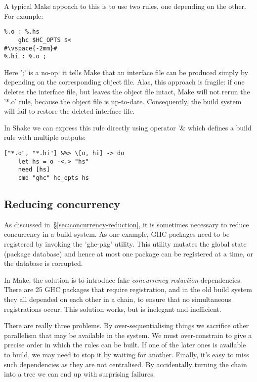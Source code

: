 A typical Make appoach to this is to use two rules, one depending on the other.
For example:

\begin{lstlisting}
%.o : %.hs
    ghc $HC_OPTS $<
#\vspace{-2mm}#
%.hi : %.o ;
\end{lstlisting}
\noindent Here \lst';' is a no-op: it tells Make that an interface file can be
produced simply by depending on the corresponding object file. Alas, this
approach is fragile: if one deletes the interface file, but leaves the object
file intact, Make will not rerun the \lst'*.o' rule, because the object file is
up-to-date. Consequently, the build system will fail to restore the deleted
interface file.

In Shake we can express this rule directly using operator \lst'&%
which defines a build rule with multiple outputs:


\begin{lstlisting}
["*.o", "*.hi"] &%> \[o, hi] -> do
    let hs = o -<.> "hs"
    need [hs]
    cmd "ghc" hc_opts hs
\end{lstlisting}

\subsection{Reducing concurrency\label{sec:ghc-pkg-db}}

As discussed in~\S\ref{sec:concurrency-reduction}, it is sometimes necessary to
reduce concurrency in a build system. As one example, GHC packages need to
be registered by invoking the \lst'ghc-pkg' utility. This utility mutates the
global state (package database) and hence at most one package can be registered
at a time, or the database is corrupted. 

In Make, the solution is to introduce fake \emph{concurrency
reduction} dependencies. There are 25 GHC packages that require registration,
and in the old build system they all depended on each other in a chain, to
ensure that no simultaneous registrations occur. This solution works, but is
inelegant and inefficient.

There are really three problems. By over-sequentialising things we sacrifice
other parallelism that may be available in the system. We must over-constrain to
give a precise order in which the rules can be built. If one of the later ones
is available to build, we may need to stop it by waiting for another. Finally,
it's easy to miss such dependencies as they are not centralised. By accidentally
turning the chain into a tree we can end up with surprising failures.

